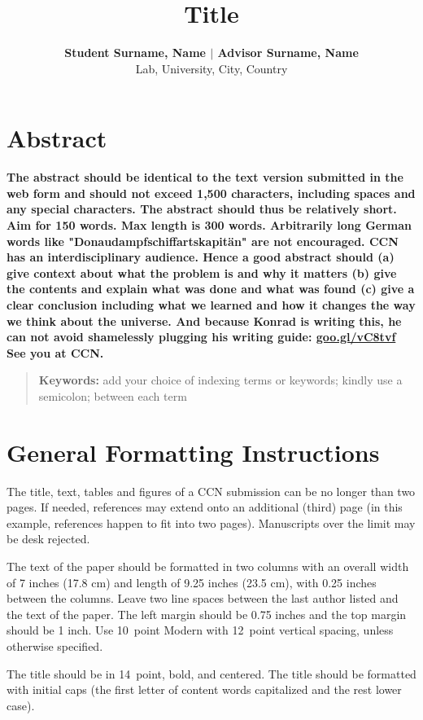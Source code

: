\documentclass[10pt,letterpaper]{article}
\title{Title}
\author{{\large \bf Student Surname, Name $\mid$  Advisor Surname, Name} \\
   Lab, University, City, Country
}
\begin{document}
\maketitle


\section{Abstract}
{
\bf
The abstract should be identical to the text version submitted in the web form and should not exceed 1,500 characters, including spaces and any special characters. The abstract should thus be relatively short. Aim for 150 words.
Max length is 300 words. Arbitrarily long German words like "Donaudampfschiffartskapit\"an" are not encouraged.
CCN has an interdisciplinary audience. Hence a good abstract should
(a) give context about what the problem is and why it matters 
(b) give the contents and explain what was done and what was found
(c) give a clear conclusion including what we learned and how it changes 
the way we think about the universe.
And because Konrad is writing this, he can not avoid shamelessly plugging
his writing guide:
\url{goo.gl/vC8tvf} See you at CCN.
}
\begin{quote}
\small
\textbf{Keywords:} 
add your choice of indexing terms or keywords; kindly use a
semicolon; between each term
\end{quote}

\section{General Formatting Instructions}

The title, text, tables and figures of a CCN submission can be no longer than two
pages. If needed, references may extend onto an additional (third) page (in this example, references happen to fit into two pages). Manuscripts over the limit may be desk rejected.


The text of the paper should be formatted in two columns with an
overall width of 7 inches (17.8 cm) and length of 9.25 inches (23.5
cm), with 0.25 inches between the columns. Leave two line spaces
between the last author listed and the text of the paper. The left
margin should be 0.75 inches and the top margin should be 1 inch.
Use 10~point Modern with 12~point vertical spacing, unless
otherwise specified.

The title should be in 14~point, bold, and centered. The title should
be formatted with initial caps (the first letter of content words
capitalized and the rest lower case). 
\end{document}
